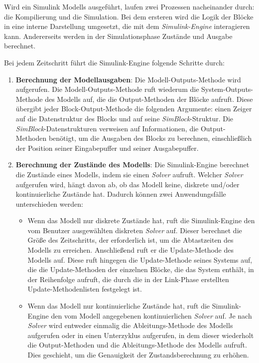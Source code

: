Wird ein Simulink Modells ausgeführt, laufen zwei Prozessen nacheinander durch: die Kompilierung und die Simulation. Bei dem ersteren wird die Logik der Blöcke in eine interne Darstellung umgesetzt, die mit dem \textit{Simulink-Engine} interagieren kann. Andererseits werden in der Simulationsphase Zustände und Ausgabe berechnet.  \cite{SimulinkSimulationMATLAB}

Bei jedem Zeitschritt führt die Simulink-Engine folgende Schritte durch:

\begin{enumerate}
    \item \textbf{Berechnung der Modellausgaben}: Die Modell-Outputs-Methode wird aufgerufen. Die Modell-Outputs-Methode ruft wiederum die System-Outputs-Methode des Modells auf, die die Output-Methoden der Blöcke aufruft. Diese übergibt jeder Block-Output-Methode die folgenden Argumente: einen Zeiger auf die Datenstruktur des Blocks und auf seine \textit{SimBlock}-Struktur. Die \textit{SimBlock}-Datenstrukturen verweisen auf Informationen, die Output-Methoden benötigt, um die Ausgaben des Blocks zu berechnen, einschließlich der Position seiner Eingabepuffer und seiner Ausgabepuffer.
    \item \textbf{Berechnung der Zustände des Modells}: Die Simulink-Engine berechnet die Zustände eines Modells, indem sie einen \textit{Solver} aufruft. Welcher \textit{Solver} aufgerufen wird, hängt davon ab, ob das Modell keine, diskrete und/oder kontinuierliche Zustände hat. Dadurch können zwei Anwendungsfälle unterschieden werden:
    \begin{itemize}
        \item Wenn das Modell nur diskrete Zustände hat, ruft die Simulink-Engine den vom Benutzer ausgewählten diskreten \textit{Solver} auf. Dieser berechnet die Größe des Zeitschritts, der erforderlich ist, um die Abtastzeiten des Modells zu erreichen. Anschließend ruft er die Update-Methode des Modells auf. Diese ruft hingegen die Update-Methode seines Systems auf, die die Update-Methoden der einzelnen Blöcke, die das System enthält, in der Reihenfolge aufruft, die durch die in der Link-Phase erstellten Update-Methodenlisten festgelegt ist.
        \item Wenn das Modell nur kontinuierliche Zustände hat, ruft die Simulink-Engine den vom Modell angegebenen kontinuierlichen \textit{Solver} auf. Je nach \textit{Solver} wird entweder einmalig die Ableitungs-Methode des Modells aufgerufen oder in einen Unterzyklus aufgerufen, in dem dieser wiederholt die Output-Methoden und die Ableitungs-Methode des Modells aufruft. Dies geschieht, um die Genauigkeit der Zustandsberechnung zu erhöhen. 
    \end{itemize}


\end{enumerate}
